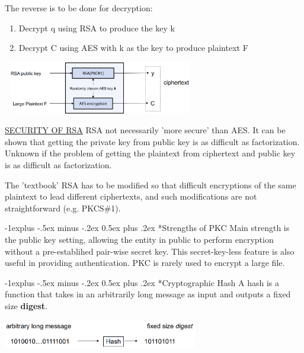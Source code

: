 \documentclass[10pt,landscape]{article}
\makeatletter
\renewcommand{\subsection}{\@startsection{subsection}{2}{0mm}%
                                {-1explus -.5ex minus -.2ex}%
                                {0.5ex plus .2ex}%
                                {\normalfont\normalsize\bfseries}}
\makeatother
\begin{document}
\begin{multicols*}{3}
The reverse is to be done for decryption:
\begin{enumerate}[noitemsep,wide=0pt, leftmargin=\dimexpr\labelwidth + 2\labelsep\relax]
    \item Decrypt q using RSA to produce the key k
    \item Decrypt C using AES with k as the key to produce plaintext F
\end{enumerate}
\includegraphics*[height=2.3cm, width=8.5cm]{images/largefilersa.png}

\underline{SECURITY OF RSA} \newline
RSA not necessarily 'more secure' than AES. It can be shown that getting the private key
from public key is as difficult as factorization. Unknown if the problem of
getting the plaintext from ciphertext and public key is as difficult as factorization. \newline

The 'textbook' RSA has to be modified so that difficult encryptions of the same plaintext to lead different
ciphertexts, and such modifications are not straightforward (e.g. PKCS\#1).

\subsection*{Strengths of PKC}
Main strength is the public key setting, allowing the entity in public to perform encryption without a pre-establihed pair-wise secret key.
This secret-key-less feature is also useful in providing authentication. PKC is rarely used to encrypt a large file.

\subsection*{Cryptographic Hash}
A hash is a function that takes in an arbitrarily long message as input and outputs a fixed size \textbf{digest}.

\includegraphics*[height=1.3cm, width=8.5cm]{images/hash.png}


\end{multicols*}
\end{document}
